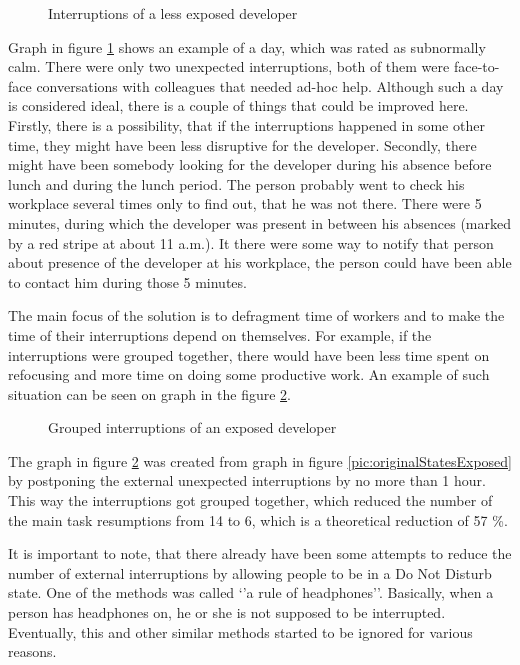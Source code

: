 \documentclass[11pt,singleside]{myfithesis2}
\newcommand{\pict}[4]{
	\begin{figure}[h!]
  		\vspace{-7px}
  		\centerline{\fcolorbox{darkgray}{palegray}{\texttt{[image: \#2]}}}
  		\caption{#1}
  		\label{#4}
	\end{figure}
}
\begin{document}
\pict{Interruptions of a less exposed developer}{data/originalStatesNormal.png}{width=0.8\textwidth}{pic:originalStatesNormal}

Graph in figure \ref{pic:originalStatesNormal} shows an example of a day, which was rated as subnormally calm. There were only two unexpected interruptions, both of them were face-to-face conversations with colleagues that needed ad-hoc help. Although such a day is considered ideal, there is a couple of things that could be improved here. Firstly, there is a possibility, that if the interruptions happened in some other time, they might have been less disruptive for the developer. Secondly, there might have been somebody looking for the developer during his absence before lunch and during the lunch period. The person probably went to check his workplace several times only to find out, that he was not there. There were 5 minutes, during which the developer was present in between his absences (marked by a red stripe at about 11 a.m.). It there were some way to notify that person about presence of the developer at his workplace, the person could have been able to contact him during those 5 minutes.


The main focus of the solution is to defragment time of workers and to make the time of their interruptions depend on themselves. For example, if the interruptions were grouped together, there would have been less time spent on refocusing and more time on doing some productive work. An example of such situation can be seen on graph in the figure \ref{pic:groupedStates}.

\pict{Grouped interruptions of an exposed developer}{data/groupedStates.png}{width=0.8\textwidth}{pic:groupedStates}

The graph in figure \ref{pic:groupedStates} was created from graph in figure \ref{pic:originalStatesExposed} by postponing the external unexpected interruptions by no more than 1 hour. This way the interruptions got grouped together, which reduced the number of the main task resumptions from 14 to 6, which is a theoretical reduction of 57 \%. 

It is important to note, that there already have been some attempts to reduce the number of external interruptions by allowing people to be in a Do Not Disturb state. One of the methods was called `'a rule of headphones''. Basically, when a person has headphones on, he or she is not supposed to be interrupted. Eventually, this and other similar methods started to be ignored for various reasons.
\end{document}
